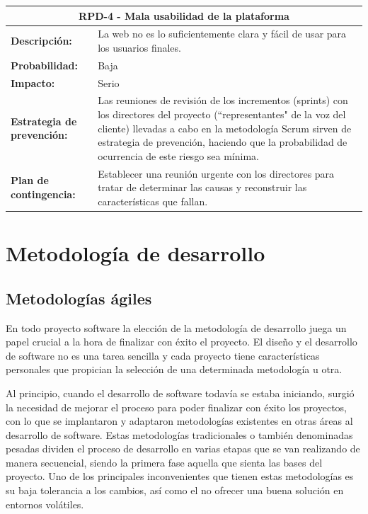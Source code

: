 \begin{table}[H]
	\begin{tabular}{| p{4cm}| p{10cm} |}
		\hline
		\multicolumn{2}{|c|}{\textbf{RPD-4} - Mala usabilidad de la plataforma} \\ \hline
		\textbf{Descripción:} & La web no es lo suficientemente clara y fácil de usar para los usuarios finales. \\ \hline
		\textbf{Probabilidad:} & Baja \\ \hline
		\textbf{Impacto:} & Serio \\ \hline
		\textbf{Estrategia de prevención:} & Las reuniones de revisión de los incrementos (sprints) con los directores del proyecto (``representantes" de la voz del cliente) llevadas a cabo en la metodología Scrum sirven de estrategia de prevención, haciendo que la probabilidad de ocurrencia de este riesgo sea mínima. \\ \hline
		\textbf{Plan de contingencia:} & Establecer una reunión urgente con los directores para tratar de determinar las causas y reconstruir las características que fallan. \\ \hline
	\end{tabular}
\end{table}

\section{Metodología de desarrollo} \label{metodologia}

\subsection{Metodologías ágiles}
En todo proyecto software la elección de la metodología de desarrollo juega un papel crucial a la hora de finalizar con éxito el proyecto. El diseño y el desarrollo de software no es una tarea sencilla y cada proyecto tiene características personales que propician la selección de una determinada metodología u otra.

Al principio, cuando el desarrollo de software todavía se estaba iniciando, surgió la necesidad de mejorar el proceso para poder finalizar con éxito los proyectos, con lo que se implantaron y adaptaron metodologías existentes en otras áreas al desarrollo de software. Estas metodologías tradicionales o también denominadas pesadas dividen el proceso de desarrollo en varias etapas que se van realizando de manera secuencial, siendo la primera fase aquella que sienta las bases del proyecto. Uno de los principales inconvenientes que tienen estas metodologías es su baja tolerancia a los cambios, así como el no ofrecer una buena solución en entornos volátiles.

